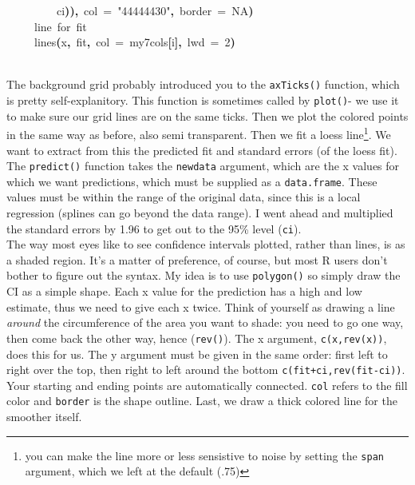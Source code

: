 \documentclass[a4paper]{article}
\newcommand{\hlnumber}[1]{\textcolor[rgb]{0.0823529411764706,0.0784313725490196,0.709803921568627}{#1}}%
\newcommand{\hlfunctioncall}[1]{\textcolor[rgb]{1,0,0}{#1}}%
\newcommand{\hlstring}[1]{\textcolor[rgb]{0.6,0.6,1}{#1}}%
\newcommand{\hlkeyword}[1]{\textcolor[rgb]{0,0,0}{\textbf{#1}}}%
\newcommand{\hlargument}[1]{\textcolor[rgb]{0.694117647058824,0.247058823529412,0.0196078431372549}{#1}}%
\newcommand{\hlcomment}[1]{\textcolor[rgb]{0.8,0.8,0.8}{#1}}%
\newcommand{\hlsymbol}[1]{\textcolor[rgb]{0,0,0}{#1}}%
\newcommand{\hlprompt}[1]{\textcolor[rgb]{0,0,0}{#1}}%
\newcommand{\hlstd}[1]{\textcolor[rgb]{0,0,0}{#1}}%
\newenvironment{Houtput}{\raggedright}{%
%
}
\begin{document}
\begin{Houtput}
\hlstd{}\hlprompt{{\ }}{\ }{\ }{\ }{\ }{\ }{\ }{\ }{\ }\hlsymbol{ci}\hlkeyword{)}\hlkeyword{)}\hlkeyword{,}{\ }\hlargument{col}{\ }\hlargument{=}{\ }\hlstring{"\usebox{\hlnormalsizeboxhash}44444430"}\hlkeyword{,}{\ }\hlargument{border}{\ }\hlargument{=}{\ }\hlnumber{NA}\hlkeyword{)}\hspace*{\fill}\\
\hlstd{}\hlprompt{{\ }}{\ }{\ }{\ }{\ }\hlcomment{\usebox{\hlnormalsizeboxhash}{\ }line{\ }for{\ }fit}\hspace*{\fill}\\
\hlstd{}\hlprompt{{\ }}{\ }{\ }{\ }{\ }\hlfunctioncall{lines}\hlkeyword{(}\hlsymbol{x}\hlkeyword{,}{\ }\hlsymbol{fit}\hlkeyword{,}{\ }\hlargument{col}{\ }\hlargument{=}{\ }\hlsymbol{my7cols}\hlkeyword{[}\hlsymbol{i}\hlkeyword{]}\hlkeyword{,}{\ }\hlargument{lwd}{\ }\hlargument{=}{\ }\hlnumber{2}\hlkeyword{)}\hspace*{\fill}\\
\hlstd{}\hlprompt{{\ }}\hlkeyword{\usebox{\hlnormalsizeboxclosebrace}}\mbox{}
\normalfont
\hspace*{\fill}\\
\hlstd{}
\end{Houtput}
{\tikzexternaldisable

}

The background grid probably introduced you to the \texttt{axTicks()} function, which is pretty self-explanitory. This function is sometimes called by \texttt{plot()}- we use it to make sure our grid lines are on the same ticks. Then we plot the colored points in the same way as before, also semi transparent. Then we fit a loess line\footnote{you can make the line more or less sensistive to noise by setting the \texttt{span} argument, which we left at the default (.75)}. We want to extract from this the predicted fit and standard errors (of the loess fit). The \texttt{predict()} function takes the \texttt{newdata} argument, which are the x values for which we want predictions, which must be supplied as a \texttt{data.frame}. These values must be within the range of the original data, since this is a local regression (splines can go beyond the data range). I went ahead and multiplied the standard errors by 1.96 to get out to the 95\% level (\texttt{ci}).\\

The way most eyes like to see confidence intervals plotted, rather than lines, is as a shaded region. It's a matter of preference, of course, but most R users don't bother to figure out the syntax. My idea is to use \texttt{polygon()} so simply draw the CI as a simple shape. Each x value for the prediction has a high and low estimate, thus we need to give each x twice.  Think of yourself as drawing a line \textit{around} the circumference of the area you want to shade: you need to go one way, then come back the other way, hence (\texttt{rev()}). The x argument, \texttt{c(x,rev(x))}, does this for us. The y argument must be given in the same order: first left to right over the top, then right to left around the bottom \texttt{c(fit+ci,rev(fit-ci))}. Your starting and ending points are automatically connected. \texttt{col} refers to the fill color and \texttt{border} is the shape outline. Last, we draw a thick colored line for the smoother itself.
\end{document}
